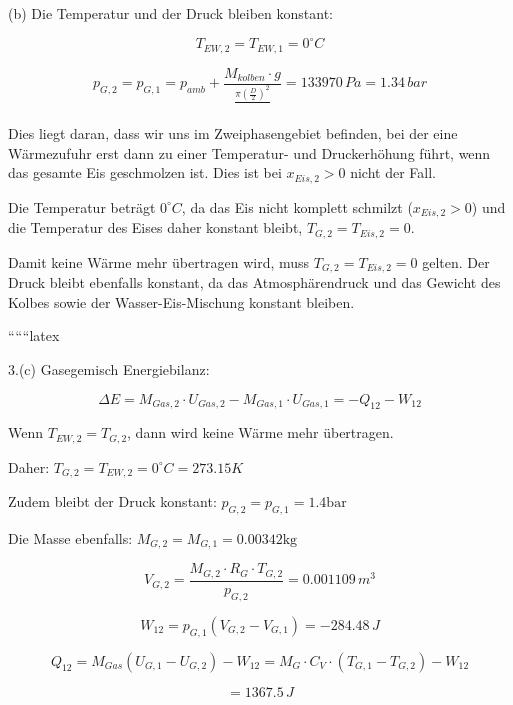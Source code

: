 (b) Die Temperatur und der Druck bleiben konstant:

\[
T_{EW,2} = T_{EW,1} = 0^\circ C
\]

\[
p_{G,2} = p_{G,1} = p_{amb} + \frac{M_{kolben} \cdot g}{\frac{\pi \left( \frac{D}{2} \right)^2}{}} = 133970 \, Pa = 1.34 \, bar
\]

Dies liegt daran, dass wir uns im Zweiphasengebiet befinden, bei der eine Wärmezufuhr erst dann zu einer Temperatur- und Druckerhöhung führt, wenn das gesamte Eis geschmolzen ist. Dies ist bei \( x_{Eis,2} > 0 \) nicht der Fall.

Die Temperatur beträgt \( 0^\circ C \), da das Eis nicht komplett schmilzt (\( x_{Eis,2} > 0 \)) und die Temperatur des Eises daher konstant bleibt, \( T_{G,2} = T_{Eis,2} = 0 \).

Damit keine Wärme mehr übertragen wird, muss \( T_{G,2} = T_{Eis,2} = 0 \) gelten. Der Druck bleibt ebenfalls konstant, da das Atmosphärendruck und das Gewicht des Kolbes sowie der Wasser-Eis-Mischung konstant bleiben.

``````latex


3.(c) Gasegemisch Energiebilanz:

\[
\Delta E = M_{Gas,2} \cdot U_{Gas,2} - M_{Gas,1} \cdot U_{Gas,1} = -Q_{12} - W_{12}
\]

Wenn \( T_{EW,2} = T_{G,2} \), dann wird keine Wärme mehr übertragen.

Daher: \( T_{G,2} = T_{EW,2} = 0^\circ C = 273.15 K \)

Zudem bleibt der Druck konstant: \( p_{G,2} = p_{G,1} = 1.4 \text{bar} \)

Die Masse ebenfalls: \( M_{G,2} = M_{G,1} = 0.00342 \text{kg} \)

\[
V_{G,2} = \frac{M_{G,2} \cdot R_G \cdot T_{G,2}}{p_{G,2}} = 0.001109 \, m^3
\]

\[
W_{12} = p_{G,1} \left( V_{G,2} - V_{G,1} \right) = -284.48 \, J
\]

\[
Q_{12} = M_{Gas} \left( U_{G,1} - U_{G,2} \right) - W_{12} = M_G \cdot C_V \cdot (T_{G,1} - T_{G,2}) - W_{12}
\]

\[
= 1367.5 \, J
\]